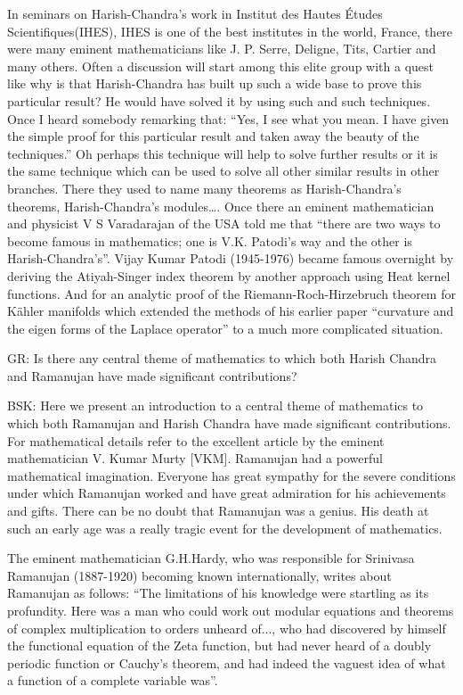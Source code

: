 In seminars on Harish-Chandra’s work in  Institut des Hautes Études Scientifiques(IHES),  IHES is one of the best institutes in the world, France, there were many eminent mathematicians like J. P. Serre, Deligne, Tits, Cartier and many others.  Often a discussion will start among this elite group with a quest like why is that Harish-Chandra has built up such a wide base to prove this particular result?  He would have solved it by using such and such techniques. Once I heard somebody remarking that: “Yes, I see what you mean. I have given the simple proof for this particular result and taken away the beauty of the techniques.” Oh perhaps this technique will help to solve further results or it is the same technique which can be used to solve all other similar results in other branches.  There they used to name many theorems as Harish-Chandra’s theorems, Harish-Chandra’s modules….  Once there an eminent mathematician and physicist V S Varadarajan of the USA told me that “there are two ways to become famous in mathematics; one is V.K. Patodi’s way and the other is Harish-Chandra’s”. Vijay Kumar Patodi (1945-1976) became famous overnight by deriving the Atiyah-Singer index theorem by another approach using Heat kernel functions. And for an analytic proof of the Riemann-Roch-Hirzebruch theorem for Kähler manifolds which extended the methods of his earlier paper “curvature and the eigen forms of the Laplace operator” to a much more complicated situation.

GR: Is there any central theme of mathematics to which both Harish Chandra and Ramanujan have made significant contributions?

 BSK: Here we present an introduction to a central theme of mathematics to which both Ramanujan and Harish Chandra have made significant contributions. For mathematical details refer to the excellent article by the eminent mathematician V. Kumar Murty [VKM]. Ramanujan had a powerful mathematical imagination.  Everyone has great sympathy for the severe conditions under which Ramanujan worked and have great admiration for his achievements and gifts. There can be no doubt that Ramanujan was a genius. His death at such an early age was a really tragic event for the development of mathematics.
 
 The eminent mathematician G.H.Hardy, who was responsible for Srinivasa Ramanujan (1887-1920) becoming known internationally, writes about Ramanujan as follows: “The limitations of his knowledge were startling as its profundity. Here was a man who could work out modular equations and theorems of complex   multiplication to orders unheard of..., who had discovered by himself the functional equation of the Zeta function, but had never heard of a doubly periodic function or Cauchy’s theorem,  and had indeed the vaguest idea of what a function of a complete variable was”.
 
